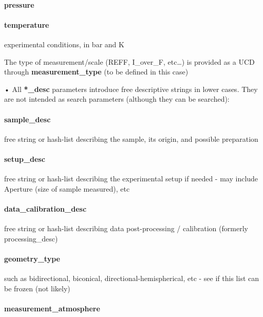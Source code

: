 \documentclass[11pt,a4paper]{ivoa}
\begin{document}
\paragraph{pressure}

\paragraph{\textbf{temperature}}

experimental conditions, in bar and K

The type of measurement/scale (REFF, I\_over\_F, etc…) is provided as a UCD through \textbf{measurement\_type} (to be defined in this case)

• All \textbf{*\_desc} parameters introduce free descriptive strings in lower cases. They are not intended as search parameters (although they can be searched):

\paragraph{sample\_desc}

free string or hash-list describing the sample, its origin, and possible preparation

\paragraph{setup\_desc}

free string or hash-list describing the experimental setup if needed - may include Aperture (size of sample measured), etc

\paragraph{data\_calibration\_desc}

free string or hash-list describing data post-processing / calibration (formerly processing\_desc)

\paragraph{geometry\_type}

such as bidirectional, biconical, directional-hemispherical, etc - see if this list can be frozen (not likely)

\paragraph{measurement\_atmosphere}
\end{document}
